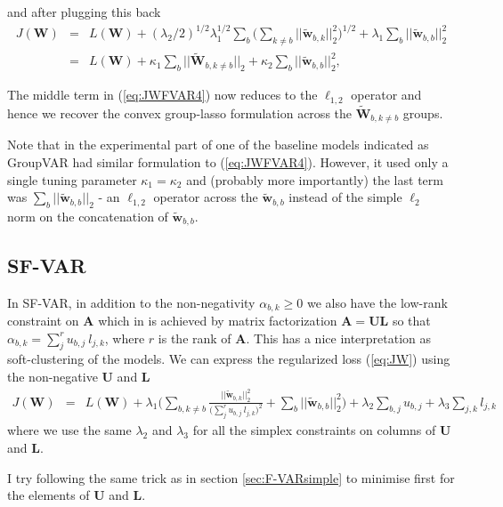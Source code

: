 \documentclass[a4paper]{article}
\newcommand{\vc}[1]{\mathbf{#1}}
\begin{document}
and after plugging this back
\begin{eqnarray}\label{eq:JWFVAR4}
\mathit{J}(\vc{W}) & = & \mathit{L}(\vc{W}) + (\lambda_2/2)^{1/2} \lambda_1^{1/2} \sum_b \Big( \sum_{k \neq b} ||\tilde{\vc{w}}_{b,k}||_2^2 \Big)^{1/2} + \lambda_1 \sum_b ||\tilde{\vc{w}}_{b,b}||_2^2 \nonumber \\
& = & \mathit{L}(\vc{W}) + \kappa_1 \sum_b ||\tilde{\vc{W}}_{b,k \neq b}||_2  + \kappa_2 \sum_b ||\tilde{\vc{w}}_{b,b}||_2^2,
\end{eqnarray}

The middle term in (\ref{eq:JWFVAR4}) now reduces to the $\ell_{1,2}$ operator and hence we recover the convex group-lasso formulation across the $\tilde{\vc{W}}_{b,k \neq b}$ groups.

Note that in the experimental part of \cite{Gregorova2015} one of the baseline models indicated as GroupVAR had similar formulation to (\ref{eq:JWFVAR4}). However, it used only a single tuning parameter $\kappa_1 = \kappa_2$ and (probably more importantly) the last term was $\sum_b ||\tilde{\vc{w}}_{b,b}||_2$ - an $\ell_{1,2}$ operator across the $\tilde{\vc{w}}_{b,b}$ instead of the simple $\ell_2$ norm on the concatenation of $\tilde{\vc{w}}_{b,b}$.

\subsection{SF-VAR}
In SF-VAR, in addition to the non-negativity $\alpha_{b,k} \geq 0$ we also have the low-rank constraint on $\vc{A}$ which in \cite{Gregorova2015} is achieved by matrix factorization $\vc{A} = \vc{UL}$ so that $\alpha_{b,k} = \sum_j^r u_{b,j} ~ l_{j,k}$, where $r$ is the rank of $\vc{A}$.
This has a nice interpretation as soft-clustering of the models.
We can express the regularized loss (\ref{eq:JW}) using the non-negative $\vc{U}$ and $\vc{L}$
\begin{eqnarray}\label{eq:JWSFVAR}
\mathit{J}(\vc{W}) & = & \mathit{L}(\vc{W}) + \lambda_1 \Big( \sum_{b,k \neq b} \frac{||\tilde{\vc{w}}_{b,k}||_2^2 }{\big( \sum_j^r u_{b,j} ~ l_{j,k} \big)^2} + \sum_b ||\tilde{\vc{w}}_{b,b}||_2^2 \Big) + \lambda_2 \sum_{b,j} u_{b,j} + \lambda_3 \sum_{j,k} l_{j,k}
\end{eqnarray}
where we use the same $\lambda_2$ and $\lambda_3$ for all the simplex constraints on columns of $\vc{U}$ and $\vc{L}$.

I try following the same trick as in section \ref{sec:F-VARsimple} to minimise first for the elements of $\vc{U}$ and $\vc{L}$.
\end{document}
